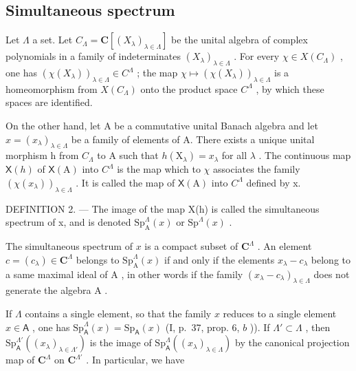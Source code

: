 \subsection{Simultaneous spectrum}

Let \(\Lambda\) a set. Let \(C_{\Lambda} = \mathbf{C}[(X_{\lambda})_{\lambda \in \Lambda}]\) be the unital algebra of complex polynomials in a family of indeterminates \((X_{\lambda})_{\lambda \in \Lambda}\) . For every \(\chi \in X(C_{\Lambda})\) , one has \((\chi (X_{\lambda}))_{\lambda \in \Lambda} \in C^{\Lambda}\) ; the map \(\chi \mapsto (\chi (X_{\lambda}))_{\lambda \in \Lambda}\) is a homeomorphism from \(X(C_{\Lambda})\) onto the product space \(C^{\Lambda}\) , by which these spaces are identified.

On the other hand, let A be a commutative unital Banach algebra and let \(x = (x_{\lambda})_{\lambda \in \Lambda}\) be a family of elements of A. There exists a unique unital morphism h from \(C_{\Lambda}\) to A such that \(h(\mathrm{X}_{\lambda}) = x_{\lambda}\) for all \(\lambda\) . The continuous map \(\mathsf{X}(h)\) of \(\mathsf{X}(\mathrm{A})\) into \(C^{\Lambda}\) is the map which to \(\chi\) associates the family \((\chi(x_{\lambda}))_{\lambda \in \Lambda}\) . It is called the map of \(\mathsf{X}(\mathrm{A})\) into \(C^{\Lambda}\) defined by x.

DEFINITION 2. --- The image of the map X(h) is called the simultaneous spectrum of x, and is denoted \(\mathrm{Sp}_{\mathrm{A}}^{\Lambda}(x)\) or \(\mathrm{Sp}^{\Lambda}(x)\) .

The simultaneous spectrum of \(x\) is a compact subset of \(\mathbf{C}^{\Lambda}\) . An element \(c = (c_{\lambda}) \in \mathbf{C}^{\Lambda}\) belongs to \(\mathrm{Sp}_{\mathrm{A}}^{\Lambda}(x)\) if and only if the elements \(x_{\lambda} - c_{\lambda}\) belong to a same maximal ideal of \(\mathrm{A}\) , in other words if the family \((x_{\lambda} - c_{\lambda})_{\lambda \in \Lambda}\) does not generate the algebra \(\mathrm{A}\) .

If \(\Lambda\) contains a single element, so that the family \(x\) reduces to a single element \(x \in \mathsf{A}\) , one has \(\mathrm{Sp}_{\mathsf{A}}^{\Lambda}(x) = \mathrm{Sp}_{\mathsf{A}}(x)\) (I, p.~37, prop. 6, \(b\) )). If \(\Lambda' \subset \Lambda\) , then \(\mathrm{Sp}_{\mathsf{A}}^{\Lambda'}((x_{\lambda})_{\lambda \in \Lambda'})\) is the image of \(\mathrm{Sp}_{\mathsf{A}}^{\Lambda}((x_{\lambda})_{\lambda \in \Lambda})\) by the canonical projection map of \(\mathbf{C}^{\Lambda}\) on \(\mathbf{C}^{\Lambda'}\) . In particular, we have

